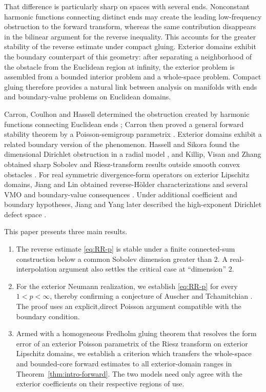\documentclass[12pt]{amsart}
\theoremstyle{remark}
\begin{document}
That difference is particularly sharp on spaces with several ends.
Nonconstant harmonic functions connecting distinct ends may create the
leading low-frequency obstruction to the forward transform, whereas the
same contribution disappears in the bilinear argument for the reverse
inequality.  This accounts for the greater stability of the reverse estimate
under compact gluing.  Exterior domains exhibit the boundary counterpart of
this geometry: after separating a neighborhood of the obstacle from the
Euclidean region at infinity, the exterior problem is assembled from a
bounded interior problem and a whole-space problem.  Compact gluing therefore
provides a natural link between analysis on manifolds with ends and
boundary-value problems on Euclidean domains.

Carron, Coulhon and Hassell determined the obstruction created by harmonic
functions connecting Euclidean ends \cite{CarronCoulhonHassell06}; Carron
then proved a general forward stability theorem by a Poisson-semigroup
parametrix \cite{Carron07}.  Exterior domains exhibit a related boundary
version of the phenomenon.  Hassell and Sikora found the dimensional
Dirichlet obstruction in a radial model \cite{HassellSikora09}, and Killip,
Visan and Zhang obtained sharp Sobolev and Riesz-transform results
outside smooth convex obstacles \cite{KillipVisanZhang16}.  For real
symmetric divergence-form operators on exterior Lipschitz domains, Jiang
and Lin obtained reverse-H\"older characterizations and several VMO and
boundary-value consequences \cite{JiangLin24}.  Under additional
coefficient and boundary hypotheses, Jiang and Yang later described the
high-exponent Dirichlet defect space \cite{JiangYang25}.

This paper presents three main results.
\begin{enumerate}[label=\textup{(\roman*)}]
\item The reverse estimate \eqref{eq:RR-p} is stable under a finite
      connected-sum construction below a common Sobolev dimension greater than $2$. A real-interpolation argument also settles the critical case at ``dimension'' $2$.
\item For the exterior Neumann realization, we        establish \eqref{eq:RR-p} for every             $1<p<\infty$, thereby confirming a              conjecture of Auscher and Tchamitchian
      \cite{AuscherTchamitchian01}. The proof uses an explicit,direct Poisson argument compatible with the boundary condition.
\item Armed with a homogeneous Fredholm gluing        theorem that resolves the form error of an
      exterior Poisson parametrix of the Riesz transform on exterior Lipschitz domains, we establish a criterion which transfers the whole-space and bounded-core forward estimates to all exterior-domain ranges in
      Theorem~\ref{thm:intro-forward}.  The two models need only agree with the exterior coefficients on their respective regions of use.
\end{enumerate}
\end{document}
